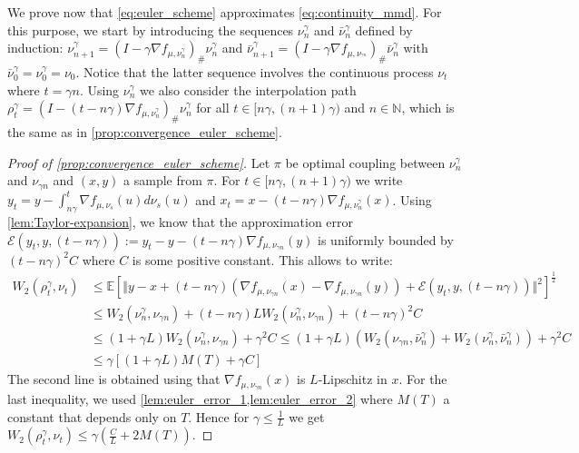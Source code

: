 We  prove now that \cref{eq:euler_scheme} approximates \cref{eq:continuity_mmd}. For this purpose, we start by introducing the sequences $\nu_n^{\gamma}$ and $\bar{\nu}_{n}^{\gamma}$
defined by induction: $\nu_{n+1}^{\gamma} =(I-\gamma\nabla f_{\mu,\nu_n^{\gamma}})_{\#}\nu_{n}^{\gamma}$ and $\bar{\nu}_{n+1}^{\gamma} =(I-\gamma\nabla f_{\mu,\nu_{^{\gamma n}}})_{\#}\bar{\nu}_{n}^{\gamma}$
 with $\bar{\nu}_{0}^{\gamma}=\nu_{0}^{\gamma}=\nu_{0}$. Notice that the latter sequence involves the continuous process $\nu_t$ where $t=\gamma n$. Using $\nu_n^{\gamma}$ we also consider the interpolation path $\rho_{t}^{\gamma}=(I-(t-n\gamma)\nabla f_{\mu,\nu_{n}^{\gamma}})_{\#}\nu_{n}^{\gamma}$ for all $t\in[n\gamma,(n+1)\gamma)$ and $n\in \mathbb{N}$, which is the same as in \cref{prop:convergence_euler_scheme}. 
\begin{proof}[Proof of \cref{prop:convergence_euler_scheme}]\label{proof:prop:convergence_euler_scheme}
Let $\pi$ be optimal coupling between $\nu_{n}^{\gamma}$ and $\nu_{\gamma n}$
and $(x,y)$ a sample from $\pi$. For $t\in[n\gamma,(n+1)\gamma)$ we write $y_{t} =y-\int_{n\gamma}^{t}\nabla f_{\mu,\nu_{s}}(u)d\nu_{s}(u)$ and $x_{t}  =x-(t-n\gamma)\nabla f_{\mu,\nu_{n}^{\gamma}}(x)$. Using \cref{lem:Taylor-expansion}, we know that the approximation error $\mathcal{E}(y_{t},y,(t-n\gamma)):=y_{t}-y-(t-n\gamma)\nabla f_{\mu,\nu_{\gamma n}}(y)$ is uniformly bounded by $(t-n\gamma)^{2}C$ where $C$ is some positive constant. This allows to write:
\begin{align*}
W_{2}(\rho_{t}^{\gamma},\nu_{t}) & \leq\mathbb{E}\left[\Vert y-x+(t-n\gamma)(\nabla f_{\mu,\nu_{\gamma n}}(x)-\nabla f_{\mu,\nu_{\gamma n}}(y))+\mathcal{E}(y_{t},y,(t-n\gamma))\Vert^{2}\right]^{\frac{1}{2}}\\
 & \leq W_{2}(\nu_{n}^{\gamma},\nu_{\gamma n})+(t-n\gamma)LW_{2}(\nu_{n}^{\gamma},\nu_{\gamma n})+(t-n\gamma)^{2}C\\
 & \leq(1+\gamma L)W_{2}(\nu_{n}^{\gamma},\nu_{\gamma n})+\gamma^{2}C \leq(1+\gamma L)(W_{2}(\nu_{\gamma n},\bar{\nu}_{n}^{\gamma}) + W_{2}(\nu_{n}^{\gamma},\bar{\nu}_{n}^{\gamma}))+\gamma^{2}C \\
 & \leq\gamma\left[(1+\gamma L)M(T)+\gamma C\right]
\end{align*}
The second line is obtained using that $\nabla f_{\mu,\nu_{\gamma n}}(x)$ is $L$-Lipschitz in $x$.  For the last inequality, we used \cref{lem:euler_error_1,lem:euler_error_2}  where $M(T)$ a constant that depends only on $T$. Hence for $\gamma\leq\frac{1}{L}$ we get $W_{2}(\rho_{t}^{\gamma},\nu_{t})\leq\gamma(\frac{C}{L}+2M(T)).$
\end{proof}

